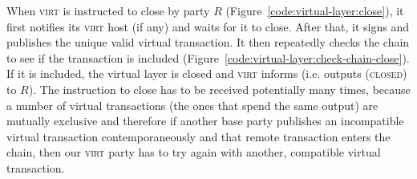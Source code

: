   When \textsc{virt} is instructed to close by party $R$
  (Figure~\ref{code:virtual-layer:close}), it first notifies its \textsc{virt}
  host (if any) and waits for it to close. After that, it signs and publishes
  the unique valid virtual transaction. It then repeatedly checks the chain to
  see if the transaction is included
  (Figure~\ref{code:virtual-layer:check-chain-close}). If it is included, the
  virtual layer is closed and \textsc{virt} informs (i.e. outputs
  (\textsc{closed}) to $R$). The
  instruction to close has to be received potentially many times, because a
  number of virtual transactions (the ones that spend the same output) are
  mutually exclusive and therefore if another base party publishes an
  incompatible virtual transaction contemporaneously and that remote transaction
  enters the chain, then our \textsc{virt} party has to try again with another,
  compatible virtual transaction.
